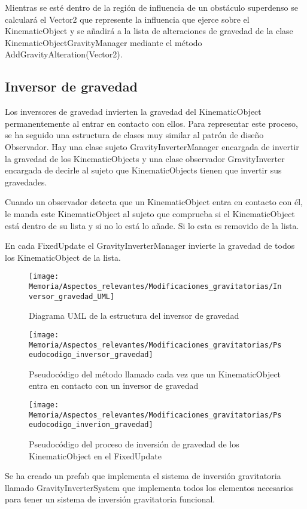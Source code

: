 Mientras se esté dentro de la región de influencia de un obstáculo superdenso se calculará el Vector2 que represente la influencia que ejerce sobre el KinematicObject y se añadirá a la lista de alteraciones de gravedad de la clase KinematicObjectGravityManager mediante el método AddGravityAlteration(Vector2).

\subsection{Inversor de gravedad}
Los inversores de gravedad invierten la gravedad del KinematicObject permanentemente al entrar en contacto con ellos. Para representar este proceso, se ha seguido una estructura de clases muy similar al patrón de diseño Observador. Hay una clase sujeto GravityInverterManager encargada de invertir la gravedad de los KinematicObjects y una clase observador GravityInverter encargada de decirle al sujeto que KinematicObjects tienen que invertir sus gravedades.

Cuando un observador detecta que un KinematicObject entra en contacto con él, le manda este KinematicObject al sujeto que comprueba si el KinematicObject está dentro de su lista y si no lo está lo añade. Si lo esta es removido de la lista.

En cada FixedUpdate el GravityInverterManager invierte la gravedad de todos los KinematicObject de la lista.

\begin{figure}[h]
\centering
\texttt{[image: Memoria/Aspectos\_relevantes/Modificaciones\_gravitatorias/Inversor\_gravedad\_UML]}
\caption{Diagrama UML de la estructura del inversor de gravedad}
\end{figure}

\begin{figure}[h]
\centering
\texttt{[image: Memoria/Aspectos\_relevantes/Modificaciones\_gravitatorias/Pseudocodigo\_inversor\_gravedad]}
\caption{Pseudocódigo del método llamado cada vez que un KinematicObject entra en contacto con un inversor de gravedad}
\end{figure}

\begin{figure}[h]
\centering
\texttt{[image: Memoria/Aspectos\_relevantes/Modificaciones\_gravitatorias/Pseudocodigo\_inverion\_gravedad]}
\caption{Pseudocódigo del proceso de inversión de gravedad de los KinematicObject en el FixedUpdate}
\end{figure}

Se ha creado un prefab que implementa el sistema de inversión gravitatoria llamado GravityInverterSystem que implementa todos los elementos necesarios para tener un sistema de inversión gravitatoria funcional.

